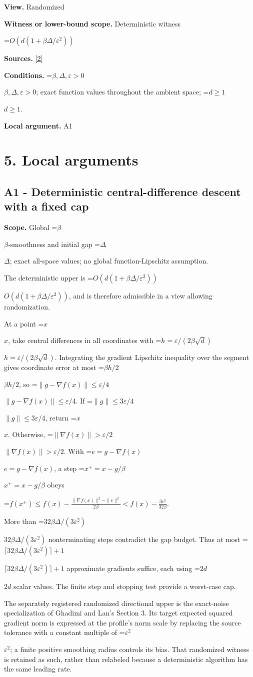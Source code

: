 \documentclass[10pt,a4paper]{article}
\newcommand{\AtlasMath}[1]{\par\begingroup\centering\setbox0=\hbox{$\displaystyle #1$}\ifdim\wd0>1.4\linewidth\typeout{ATLAS WIDE FORMULA: \the\wd0}\fi\ifdim\wd0>\linewidth\resizebox{\linewidth}{!}{\box0}\else\box0\fi\par\endgroup}
\newcommand{\AtlasInlineMath}[1]{\begingroup\setbox0=\hbox{$#1$}\ifdim\wd0>.4\linewidth\endgroup\AtlasMath{#1}\else\endgroup$#1$\fi}
\begin{document}
\textbf{View.} Randomized

\textbf{Witness or lower-bound scope.} Deterministic witness

\AtlasMath{O(d(1+\beta\Delta/\varepsilon^2))}
\textbf{Sources.} \href{https://arxiv.org/pdf/1309.5549}{[2]}

\textbf{Conditions.} \AtlasInlineMath{\beta ,\Delta ,\varepsilon >0}; exact function values throughout the ambient space; \AtlasInlineMath{d\ge 1}.

\textbf{Local argument.} A1

\section{5. Local arguments}
\subsection{A1 - Deterministic central-difference descent with a fixed cap}
\textbf{Scope.} Global \AtlasInlineMath{\beta}-smoothness and initial gap \AtlasInlineMath{\Delta}; exact all-space values; no global function-Lipschitz assumption.

The deterministic upper is \AtlasInlineMath{O(d(1+\beta\Delta/\varepsilon^2))}, and is therefore admissible in a view allowing randomization.

At a point \AtlasInlineMath{x}, take central differences in all coordinates with \AtlasInlineMath{h=\varepsilon/(2\beta\sqrt d)}. Integrating the gradient Lipschitz inequality over the segment gives coordinate error at most \AtlasInlineMath{\beta h/2}, so \AtlasInlineMath{\|g-\nabla f(x)\|\le\varepsilon/4}. If \AtlasInlineMath{\|g\|\le3\varepsilon/4}, return \AtlasInlineMath{x}. Otherwise, \AtlasInlineMath{\|\nabla f(x)\|>\varepsilon/2}. With \AtlasInlineMath{e=g-\nabla f(x)}, a step \AtlasInlineMath{x^+=x-g/\beta} obeys

\AtlasMath{f(x^+)\le f(x)-\frac{\|\nabla f(x)\|^2-\|e\|^2}{2\beta}<f(x)-\frac{3\varepsilon^2}{32\beta}.}

More than \AtlasInlineMath{32\beta\Delta/(3\varepsilon^2)} nonterminating steps contradict the gap budget. Thus at most \AtlasInlineMath{\lceil32\beta\Delta/(3\varepsilon^2)\rceil+1} approximate gradients suffice, each using \AtlasInlineMath{2d} scalar values. The finite step and stopping test provide a worst-case cap.

The separately registered randomized directional upper is the exact-noise specialization of Ghadimi and Lan's Section 3. Its target expected squared gradient norm is expressed at the profile's norm scale by replacing the source tolerance with a constant multiple of \AtlasInlineMath{\varepsilon^2}; a finite positive smoothing radius controls its bias. That randomized witness is retained as such, rather than relabeled because a deterministic algorithm has the same leading rate.
\end{document}
